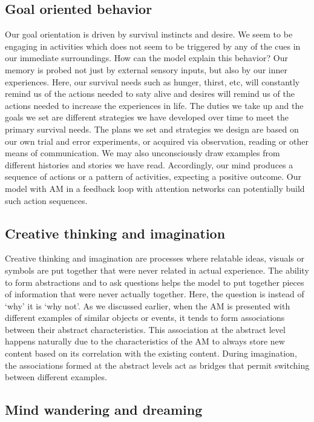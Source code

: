 \documentclass[reprint,amsmath,amssymb,apr,aip,onecolumn, 11pt]{revtex4-1}
\begin{document}
\subsection{Goal oriented behavior}
Our goal orientation is driven by survival instincts and desire. We seem to be engaging in activities which does not seem to be triggered by any of the cues in our immediate surroundings. How can the model explain this behavior? Our memory is probed not just by external sensory inputs, but also by our inner experiences. Here, our survival needs such as hunger, thirst, etc, will constantly remind us of the actions needed to saty alive and desires will remind us of the actions needed to increase the experiences in life. The duties we take up and the goals we set are different strategies we have developed over time to meet the primary survival needs. The plans we set and strategies we design are based on our own trial and error experiments, or acquired via observation, reading or other means of communication. We may also unconsciously draw examples from different histories and stories we have read. Accordingly, our mind produces a sequence of actions or a pattern of activities, expecting a positive outcome. Our model with AM in a feedback loop with attention networks can potentially build such action sequences.  

\subsection{Creative thinking and imagination}
Creative thinking and imagination are processes where relatable ideas, visuals or symbols are put together that were never related in actual experience. The ability to form abstractions and to ask questions helps the model to put together pieces of information that were never actually together. Here, the question is instead of `why' it is `why not'. As we discussed earlier, when the AM is presented with different examples of similar objects or events, it tends to form associations between their abstract characteristics. This association at the abstract level happens naturally due to the characteristics of the AM to always store new content based on its correlation with the existing content. During imagination, the associations formed at the abstract levels act as bridges that permit switching between different examples. 


\subsection{Mind wandering and dreaming}
\end{document}
